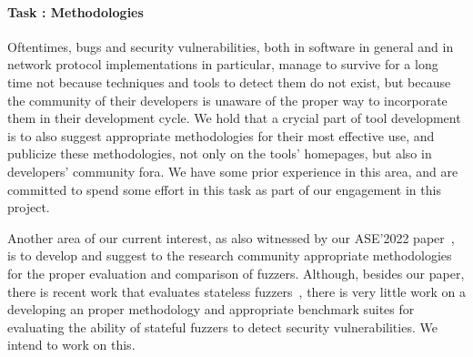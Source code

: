 \documentclass[11pt]{article}
\newcounter{Task}
\newcommand{\task}[1]{\addtocounter{Task}{1}\paragraph{Task \theTask: #1}}
\newcommand{\significance}[1]{\vspace*{-0.5em}%
  \begin{quoting}\noindent\textbf{Significance:} #1\end{quoting}}
\newcommand{\myparagraph}{}
\let\myparagraph=\paragraph
\renewcommand{\paragraph}{\vspace{-3mm}\myparagraph}
\begin{document}

\task{Methodologies}
Oftentimes, bugs and security vulnerabilities, both in software in general and
in network protocol implementations in particular, manage to survive for a
long time not because techniques and tools to detect them do not exist, but
because the community of their developers is unaware of the proper way to
incorporate them in their development cycle.  We hold that a crycial part of
tool development is to also suggest appropriate methodologies for their most
effective use, and publicize these methodologies, not only on the tools'
homepages, but also in developers' community fora.  We have some prior
experience in this area, and are committed to spend some effort in this task
as part of our engagement in this project.

Another area of our current interest, as also witnessed by our ASE'2022
paper~\cite{SoManyFuzzers@ASE-22}, is to develop and suggest to the research
community appropriate methodologies for the proper evaluation and comparison
of fuzzers.  Although, besides our paper, there is recent work that evaluates
stateless
fuzzers~\cite{EvaluatingFuzz@CCS-18,Magma@POMACS-20,UNIFUZZ@USENIX-21,FIXREVERTER@USENIX-22},
there is very little work on a developing an proper methodology and
appropriate benchmark suites for evaluating the ability of stateful fuzzers to
detect security vulnerabilities. We intend to work on this.

\end{document}
